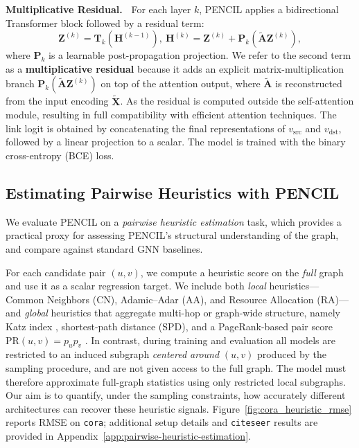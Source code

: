 \documentclass{article}
\theoremstyle{plain}
\theoremstyle{definition}
\theoremstyle{remark}
\begin{document}
\textbf{Multiplicative Residual.~}
For each layer $k$, PENCIL applies a bidirectional Transformer block followed by a residual term:
\begin{equation}
\mathbf{Z}^{(k)} = \mathbf{T}_{k}\!\left(\mathbf{H}^{(k-1)}\right), \
\mathbf{H}^{(k)} = \mathbf{Z}^{(k)} + \mathbf{P}_{k}\!\left(\tilde{\mathbf{A}}\mathbf{Z}^{(k)}\right),
\label{eq:block}
\end{equation}
where $\mathbf{P}_k$ is a learnable post-propagation projection. We refer to the second term as a \textbf{multiplicative residual} because it adds an explicit matrix-multiplication branch \(\mathbf{P}_k(\tilde{\mathbf{A}}\mathbf{Z}^{(k)})\) on top of the attention output, where \(\tilde{\mathbf{A}}\) is reconstructed from the input encoding \(\tilde{\mathbf{X}}\). As the residual is computed outside the self-attention module, resulting in full compatibility with efficient attention techniques. The link logit is obtained by concatenating the final representations of $v_{\text{src}}$ and $v_{\text{dst}}$, followed by a linear projection to a scalar. The model is trained with the binary cross-entropy (BCE) loss.


\subsection{Estimating Pairwise Heuristics with PENCIL} \label{sec:pairwise-heuristic-estimation}

We evaluate PENCIL on a \emph{pairwise heuristic estimation} task, which provides a practical proxy for assessing PENCIL's structural understanding of the graph, and compare against standard GNN baselines.

For each candidate pair \((u,v)\), we compute a heuristic score on the \emph{full} graph and use it as a scalar regression target. We include both \emph{local} heuristics---Common Neighbors (CN), Adamic--Adar (AA), and Resource Allocation (RA)---and \emph{global} heuristics that aggregate multi-hop or graph-wide structure, namely Katz index \cite{katz_new_1953}, shortest-path distance (SPD), and a PageRank-based pair score \(\mathrm{PR}(u,v)=p_u p_v\) \cite{brin_anatomy_1998}. In contrast, during training and evaluation all models are restricted to an induced subgraph \emph{centered around} \((u,v)\) produced by the sampling procedure, and are not given access to the full graph. The model must therefore approximate full-graph statistics using only restricted local subgraphs. Our aim is to quantify, under the sampling constraints, how accurately different architectures can recover these heuristic signals. Figure~\ref{fig:cora_heuristic_rmse} reports RMSE on \texttt{cora}; additional setup details and \texttt{citeseer} results are provided in Appendix~\ref{app:pairwise-heuristic-estimation}.
\end{document}

